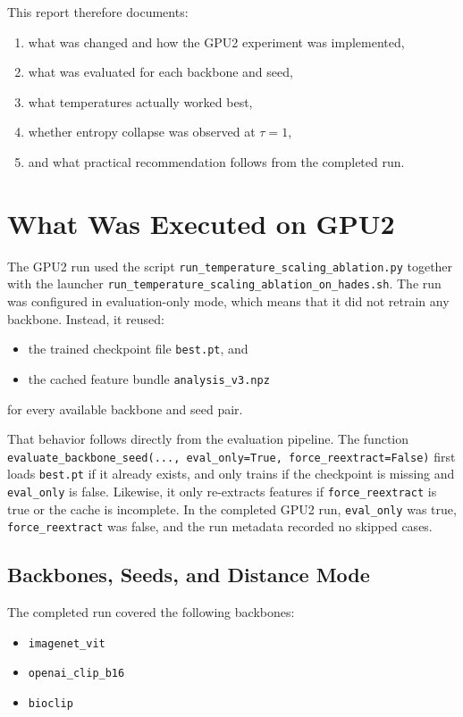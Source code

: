 \documentclass[11pt]{article}
\begin{document}
This report therefore documents:
\begin{enumerate}
  \item what was changed and how the GPU2 experiment was implemented,
  \item what was evaluated for each backbone and seed,
  \item what temperatures actually worked best,
  \item whether entropy collapse was observed at $\tau = 1$,
  \item and what practical recommendation follows from the completed run.
\end{enumerate}

\section{What Was Executed on GPU2}

The GPU2 run used the script \texttt{run\_temperature\_scaling\_ablation.py} together with the launcher \texttt{run\_temperature\_scaling\_ablation\_on\_hades.sh}. The run was configured in evaluation-only mode, which means that it did not retrain any backbone. Instead, it reused:
\begin{itemize}
  \item the trained checkpoint file \texttt{best.pt}, and
  \item the cached feature bundle \texttt{analysis\_v3.npz}
\end{itemize}
for every available backbone and seed pair.

That behavior follows directly from the evaluation pipeline. The function \texttt{evaluate\_backbone\_seed(..., eval\_only=True, force\_reextract=False)} first loads \texttt{best.pt} if it already exists, and only trains if the checkpoint is missing and \texttt{eval\_only} is false. Likewise, it only re-extracts features if \texttt{force\_reextract} is true or the cache is incomplete. In the completed GPU2 run, \texttt{eval\_only} was true, \texttt{force\_reextract} was false, and the run metadata recorded no skipped cases.

\subsection{Backbones, Seeds, and Distance Mode}

The completed run covered the following backbones:
\begin{itemize}
  \item \texttt{imagenet\_vit}
  \item \texttt{openai\_clip\_b16}
  \item \texttt{bioclip}
\end{itemize}
\end{document}
